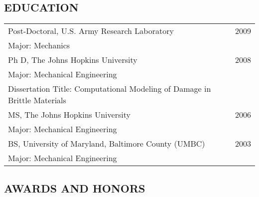 \documentclass[11pt]{article}
\begin{document}
\subsection{EDUCATION}\label{education}

\begin{flushleft}
\begin{tabularx}{\textwidth}{@{}Xr@{}}
Post-Doctoral, U.S. 
Army Research Laboratory & 2009\\
Major: Mechanics \\
\addlinespace[5pt]
Ph D, The Johns Hopkins University & 2008\\
Major: Mechanical Engineering\\
Dissertation Title: Computational Modeling of Damage in Brittle
Materials \\
\addlinespace[5pt]
MS, The Johns Hopkins University & 2006\\
Major: Mechanical Engineering \\
\addlinespace[5pt]
BS, University of Maryland, Baltimore County (UMBC) & 2003\\
Major: Mechanical Engineering
\end{tabularx}
\end{flushleft}

\subsection{AWARDS AND HONORS}\label{awards-and-honors}
\end{document}
